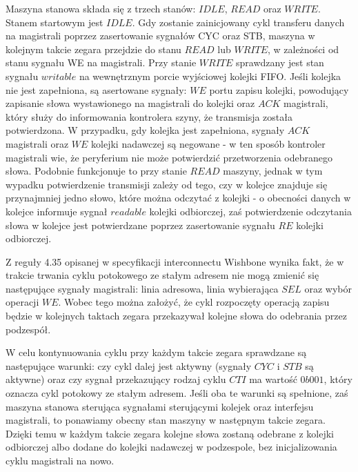 
Maszyna stanowa składa się z trzech stanów: $IDLE$, $READ$ oraz $WRITE$.
Stanem startowym jest $IDLE$. Gdy zostanie zainicjowany cykl transferu danych na magistrali poprzez zasertowanie sygnałów CYC oraz STB, maszyna w kolejnym takcie zegara przejdzie do stanu $READ$ lub $WRITE$, w zależności od stanu sygnału WE na magistrali.
Przy stanie $WRITE$ sprawdzany jest stan sygnału $writable$ na wewnętrznym porcie wyjściowej kolejki FIFO. Jeśli kolejka nie jest zapełniona, są asertowane sygnały: $WE$ portu zapisu kolejki, powodujący zapisanie słowa wystawionego na magistrali do kolejki oraz $ACK$ magistrali, który służy do informowania kontrolera szyny, że transmisja została potwierdzona. W przypadku, gdy kolejka jest zapełniona, sygnały $ACK$ magistrali oraz $WE$ kolejki nadawczej są negowane - w ten sposób kontroler magistrali wie, że peryferium nie może potwierdzić przetworzenia odebranego słowa.
Podobnie funkcjonuje to przy stanie $READ$ maszyny, jednak w tym wypadku potwierdzenie transmisji zależy od tego, czy w kolejce znajduje się przynajmniej jedno słowo, które można odczytać z kolejki - o obecności danych w kolejce informuje sygnał $readable$ kolejki odbiorczej, zaś potwierdzenie odczytania słowa w kolejce jest potwierdzane poprzez zasertowanie sygnału $RE$ kolejki odbiorczej.

Z reguły 4.35 opisanej w specyfikacji interconnectu Wishbone wynika fakt, że w trakcie trwania cyklu potokowego ze stałym adresem nie mogą zmienić się następujące sygnały magistrali: linia adresowa, linia wybierająca $SEL$ oraz wybór operacji $WE$. Wobec tego można założyć, że cykl rozpoczęty operacją zapisu będzie w kolejnych taktach zegara przekazywał kolejne słowa do odebrania przez podzespół.


W celu kontynuowania cyklu przy każdym takcie zegara sprawdzane są następujące warunki: czy cykl dalej jest aktywny (sygnały $CYC$ i $STB$ są aktywne) oraz czy sygnał przekazujący rodzaj cyklu $CTI$ ma wartość $0b001$, który oznacza cykl potokowy ze stałym adresem. Jeśli oba te warunki są spełnione, zaś maszyna stanowa sterująca sygnałami sterującymi kolejek oraz interfejsu magistrali, to ponawiamy obecny stan maszyny w następnym takcie zegara. Dzięki temu w każdym takcie zegara kolejne słowa zostaną odebrane z kolejki odbiorczej albo dodane do kolejki nadawczej w podzespole, bez inicjalizowania cyklu magistrali na nowo.

